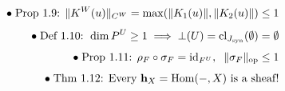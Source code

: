 \documentclass[preview]{standalone}
\begin{document}
\begin{align*}
\special{dvisvgm:raw <g id='unique000'>}\bullet\;\text{Prop 1.9: }\|K^W(u)\|_{C^W} = \max(\|K_1(u)\|,\|K_2(u)\|)\le 1\\[4pt]\bullet\;\text{Def 1.10: }\dim P^U\ge 1 \implies \bot(U)=\operatorname{cl}_{J_{\text{syn}}}(\emptyset)=\emptyset\\[4pt]\bullet\;\text{Prop 1.11: }\rho_F\circ\sigma_F = \operatorname{id}_{F^U},\;\;\|\sigma_F\|_{\text{op}}\le 1\\[4pt]\bullet\;\text{Thm 1.12: Every }\mathbf{h}_X=\operatorname{Hom}(-,X)\text{ is a sheaf!}\special{dvisvgm:raw </g>}
\end{align*}
\end{document}
